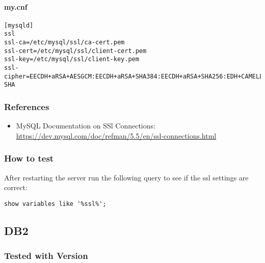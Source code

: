 \paragraph*{my.cnf}
\begin{lstlisting}
[mysqld]
ssl
ssl-ca=/etc/mysql/ssl/ca-cert.pem
ssl-cert=/etc/mysql/ssl/client-cert.pem
ssl-key=/etc/mysql/ssl/client-key.pem
ssl-cipher=EECDH+aRSA+AESGCM:EECDH+aRSA+SHA384:EECDH+aRSA+SHA256:EDH+CAMELLIA256:EECDH:EDH+aRSA:+SSLv3:!aNULL:!eNULL:!LOW:!3DES:!MD5:!EXP:!PSK:!SRP:!DSS:!RC4:!SEED:!AES128:!CAMELLIA128:!ECDSA:AES256-SHA
\end{lstlisting}





\subsubsection{References}
\begin{itemize}
  \item MySQL Documentation on SSl Connections: \url{https://dev.mysql.com/doc/refman/5.5/en/ssl-connections.html}
\end{itemize}


\subsubsection{How to test}
After restarting the server run the following query to see if the ssl settings are correct:
\begin{lstlisting}
show variables like '%ssl%';
\end{lstlisting}


\subsection{DB2}
\subsubsection{Tested with Version}


